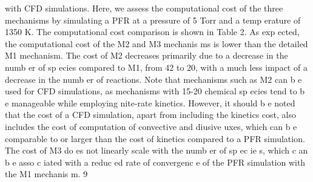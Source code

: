 \documentclass[10pt, letterpaper]{article}
\begin{document}
with CFD simulations. Here, we assess the computational cost of the three mechanisms by simulating a
PFR at a pressure of 5 Torr and a temp erature of 1350 K. The computational cost comparison is shown in
Table 2.
As exp ected, the computational cost of the M2 and M3 mechanis ms is lower than the detailed M1
mechanism. The cost of M2 decreases primarily due to a decrease in the numb er of sp ecies compared to M1,
from 42 to 20, with a much less impact of a decrease in the numb er of reactions. Note that mechanisms such
as M2 can b e used for CFD simulations, as mechanisms with 15-20 chemical sp ecies tend to b e manageable
while employing nite-rate kinetics. However, it should b e noted that the cost of a CFD simulation, apart
from including the kinetics cost, also includes the cost of computation of convective and diusive 
uxes,
which can b e comparable to or larger than the cost of kinetics compared to a PFR simulation. The cost
of M3 do es not linearly scale with the numb er of sp ec ie s, which c an b e asso c iated with a reduc ed rate of
convergenc e of the PFR simulation with the M1 mechanis m.
9
\end{document}
